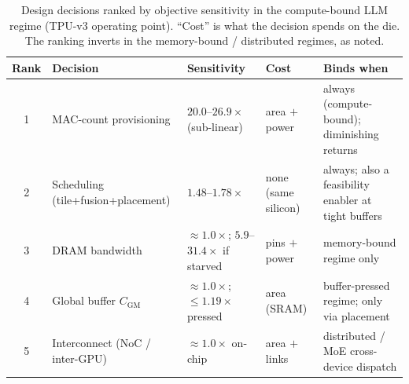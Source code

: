 \begin{table}[ht!]
\centering
\caption{Design decisions ranked by objective sensitivity in the compute-bound LLM
regime (TPU-v3 operating point). ``Cost'' is what the decision spends on the die.
The ranking inverts in the memory-bound / distributed regimes, as noted.}
\label{tab:deficit_ranking}
\small
\begin{tabular}{@{}clllp{3.5cm}@{}}
\toprule
\textbf{Rank} & \textbf{Decision} & \textbf{Sensitivity} & \textbf{Cost}
& \textbf{Binds when} \\
\midrule
1 & MAC-count provisioning & $20.0$--$26.9\times$ (sub-linear) & area $+$ power
& always (compute-bound); diminishing returns \\
2 & Scheduling (tile+fusion+placement) & $1.48$--$1.78\times$ & none (same silicon)
& always; also a feasibility enabler at tight buffers \\
3 & DRAM bandwidth & $\approx1.0\times$; $5.9$--$31.4\times$ if starved & pins $+$ power
& memory-bound regime only \\
4 & Global buffer $C_{\mathrm{GM}}$ & $\approx1.0\times$; $\le1.19\times$ pressed & area (SRAM)
& buffer-pressed regime; only via placement \\
5 & Interconnect (NoC / inter-GPU) & $\approx1.0\times$ on-chip & area $+$ links
& distributed / MoE cross-device dispatch \\
\bottomrule
\end{tabular}
\end{table}

